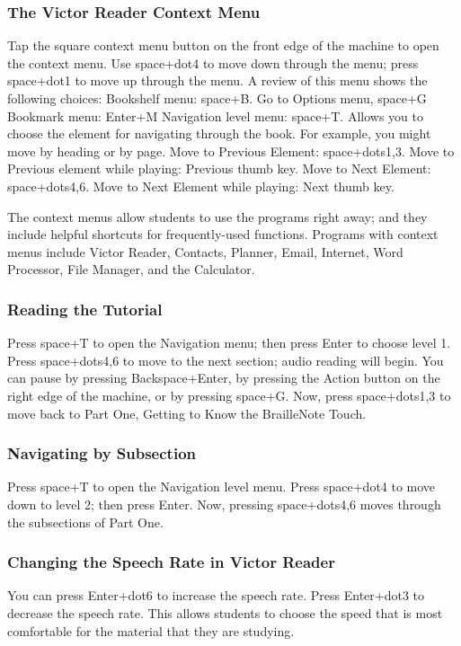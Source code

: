 \documentclass[10pt,letterpaper,twoside]{report}
\begin{document}
{{{\subsubsection{The Victor Reader Context Menu}
Tap the square context menu button on the front edge of the machine to open the context menu. Use space+dot4 to move down through the menu; press space+dot1 to move up through the menu. A review of this menu shows the following choices:
Bookshelf menu: space+B.
Go to Options menu, space+G
Bookmark menu: Enter+M
Navigation level menu: space+T. Allows you to choose the element for navigating through the book. For example, you might move by heading or by page.
Move to Previous Element: space+dots1,3. 
Move to Previous element while playing: Previous thumb key.
Move to Next Element: space+dots4,6.
Move to Next Element while playing: Next thumb key.

The context menus allow students to use the programs right away; and they include helpful shortcuts for frequently-used functions. 
Programs with context menus include Victor Reader, Contacts, Planner, Email, Internet, Word Processor, File Manager, and the Calculator.
\subsubsection{Reading the Tutorial}
Press space+T to open the Navigation menu; then press Enter to choose level 1.
Press space+dots4,6 to move to the next section; audio reading will begin. You can pause by pressing Backspace+Enter, by pressing the Action button on the right edge of the machine, or by pressing space+G.
Now, press space+dots1,3 to move back to Part One, Getting to Know the BrailleNote Touch.
\subsubsection{Navigating by Subsection}
Press space+T to open the Navigation level menu.
Press space+dot4 to move down to level 2; then press Enter.
Now, pressing space+dots4,6 moves through the subsections of Part One.

\subsubsection{Changing the Speech Rate in Victor Reader}
You can press Enter+dot6 to increase the speech rate.
Press Enter+dot3 to decrease the speech rate.
This allows students to choose the speed that is most comfortable for the material that they are studying.
}}}
\end{document}

